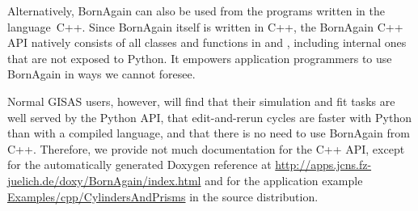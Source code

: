 Alternatively, BornAgain can also be used from the programs written
in the language~C++.
Since BornAgain itself is written in C++,
%
the BornAgain C++ API natively consists of
all classes and functions in  and ,
%
%
including internal ones that are not exposed to Python.
It empowers application programmers to use BornAgain
in ways we cannot foresee.

Normal GISAS users, however, will find that their simulation and fit tasks
are well served by the Python API,
that edit-and-rerun cycles are faster with Python than with a compiled language,
and that there is no need to use BornAgain from C++.
Therefore, we provide not much documentation for the C++ API,
except for the automatically generated Doxygen reference at
\url{http://apps.jcns.fz-juelich.de/doxy/BornAgain/index.html} and
for the application example \url{Examples/cpp/CylindersAndPrisms}
in the source distribution.


